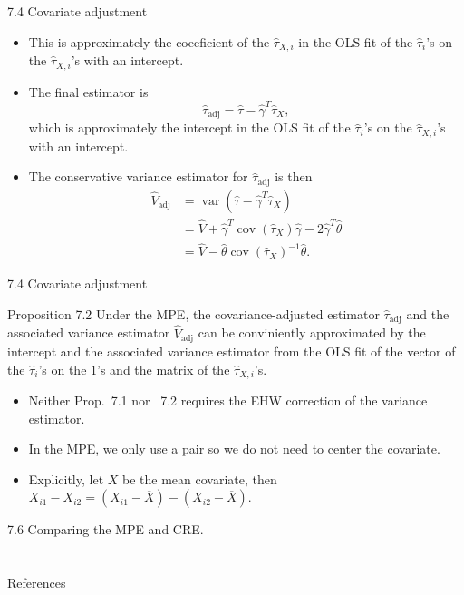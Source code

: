 \documentclass[aspectratio=169, 12pt]{beamer}
\begin{document}
\begin{frame}{7.4 Covariate adjustment}
    \begin{itemize}
        \item This is approximately the coeeficient of the $\hat{\tau}_{X,i}$ in the OLS fit of the $\hat{\tau}_i$'s on the $\hat{\tau}_{X,i}$'s with an intercept.
        \item The final estimator is
        \[
        \hat{\tau}_{\text{adj}} = \hat{\tau}-\hat{\gamma}^T\hat{\tau}_X,
        \]
        which is approximately the intercept in the OLS fit of the $\hat{\tau}_i$'s on the $\hat{\tau}_{X,i}$'s with an intercept.
        \item The conservative variance estimator for $\hat{\tau}_{\text{adj}}$ is then
        \begin{align*}
            \widehat{V}_{\text{adj}}
            &= \operatorname{var}(\hat{\tau}-\hat{\gamma}^T\hat{\tau}_X)\\
            &= \widehat{V} + \hat{\gamma}^T\operatorname{cov}(\hat{\tau}_X)\hat{\gamma} - 2\hat{\gamma}^T\hat{\theta}\\
            &= \widehat{V} - \hat{\theta}\operatorname{cov}(\hat{\tau}_X)^{-1}\hat{\theta}.
        \end{align*}
    \end{itemize}
\end{frame}

\begin{frame}{7.4 Covariate adjustment}
    \begin{keybox}{Proposition 7.2}
        Under the MPE, the covariance-adjusted estimator $\hat{\tau}_{\text{adj}}$ and the associated variance estimator $\widehat{V}_{\text{adj}}$ can be conviniently approximated by the intercept and the associated variance estimator from the OLS fit of the vector of the $\hat{\tau}_i$'s on the $1$'s and the matrix of the $\hat{\tau}_{X,i}$'s.
    \end{keybox}
    \begin{itemize}
        \item Neither Prop.~7.1 nor ~7.2 requires the EHW correction of the variance estimator.
        \item In the MPE, we only use a pair so we do not need to center the covariate.
        \item Explicitly, let $\overline{X}$ be the mean covariate, then $X_{i1}-X_{i2}=(X_{i1}-\overline{X})-(X_{i2}-\overline{X})$.
    \end{itemize}
\end{frame}

\begin{frame}{7.6 Comparing the MPE and CRE.}
    
\end{frame}




\section{}
\begin{frame}{References}
  \beamerdefaultoverlayspecification{}
  \small
  
\end{frame}
\end{document}
